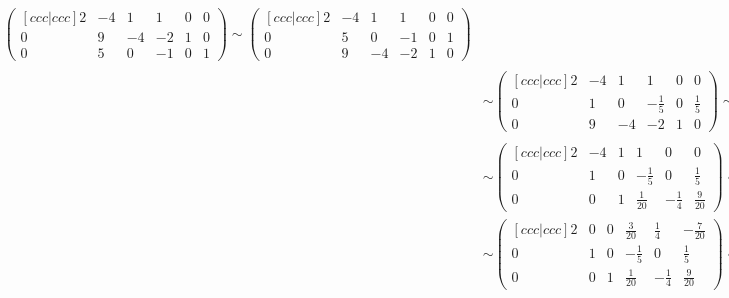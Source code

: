 \documentclass{article}
\begin{document}
\begin{enumerate}[label=(\alph*)]
\begin{align*}
\begin{pmatrix}[ccc|ccc]
            2 & -4 & 1 & 1 & 0 & 0\\ 
            0 & 9 & -4 & -2 & 1 & 0\\
            0 & 5 & 0 & -1 & 0 & 1
        \end{pmatrix} \sim \begin{pmatrix}[ccc|ccc]
            2 & -4 & 1 & 1 & 0 & 0\\
            0 & 5 & 0 & -1 & 0 & 1 \\
            0 & 9 & -4 & -2 & 1 & 0
        \end{pmatrix} \\ & \sim \begin{pmatrix}[ccc|ccc]
            2 & -4 & 1 & 1 & 0 & 0\\
            0 & 1 & 0 & -\frac{1}{5} & 0 & \frac{1}{5} \\
            0 & 9 & -4 & -2 & 1 & 0
        \end{pmatrix} \sim \begin{pmatrix}[ccc|ccc]
            2 & -4 & 1 & 1 & 0 & 0\\
            0 & 1 & 0 & -\frac{1}{5} & 0 & \frac{1}{5} \\
            0 & 0 & -4 & -\frac{1}{5} & 1 & -\frac{9}{5}
        \end{pmatrix} \\ & \sim \begin{pmatrix}[ccc|ccc]
            2 & -4 & 1 & 1 & 0 & 0\\
            0 & 1 & 0 & -\frac{1}{5} & 0 & \frac{1}{5} \\
            0 & 0 & 1 & \frac{1}{20} & -\frac{1}{4} & \frac{9}{20}
        \end{pmatrix} \sim \begin{pmatrix}[ccc|ccc]
            2 & -4 & 0 & \frac{19}{20} & \frac{1}{4} & -\frac{9}{20}\\
            0 & 1 & 0 & -\frac{1}{5} & 0 & \frac{1}{5} \\
            0 & 0 & 1 & \frac{1}{20} & -\frac{1}{4} & \frac{9}{20}
        \end{pmatrix} \\ & \sim \begin{pmatrix}[ccc|ccc]
            2 & 0 & 0 & \frac{3}{20} & \frac{1}{4} & -\frac{7}{20}\\
            0 & 1 & 0 & -\frac{1}{5} & 0 & \frac{1}{5} \\
            0 & 0 & 1 & \frac{1}{20} & -\frac{1}{4} & \frac{9}{20}
        \end{pmatrix} \sim \begin{pmatrix}[ccc|ccc]

\end{pmatrix}
\end{align*}
\end{enumerate}
\end{document}
